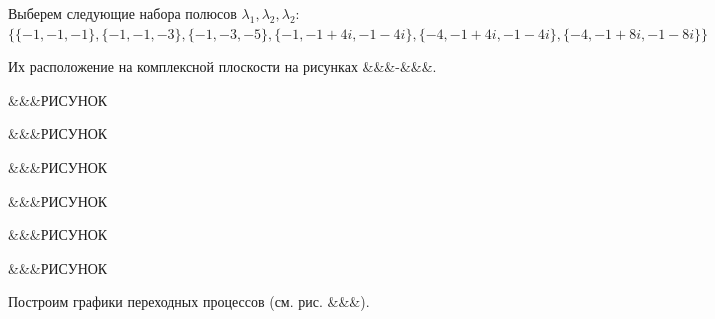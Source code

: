 \vspace{1em}
\begin{par}
\begin{flushleft}
Выберем следующие набора полюсов $\lambda_1 ,\lambda_2 ,\lambda_2$: $\lbrace \lbrace -1,-1,-1\rbrace ,\lbrace -1,-1,-3\rbrace ,\lbrace -1,-3,-5\rbrace ,\lbrace -1,-1+4i,-1-4i\rbrace ,\lbrace -4,-1+4i,-1-4i\rbrace ,\lbrace -4,-1+8i,-1-8i\rbrace \rbrace$
\end{flushleft}
\end{par}

\begin{par}
\begin{flushleft}
Их расположение на комплексной плоскости на рисунках \&\&\&-\&\&\&.
\end{flushleft}
\end{par}

\begin{par}
\begin{flushleft}
\&\&\&РИСУНОК
\end{flushleft}
\end{par}

\begin{par}
\begin{flushleft}
\&\&\&РИСУНОК
\end{flushleft}
\end{par}

\begin{par}
\begin{flushleft}
\&\&\&РИСУНОК
\end{flushleft}
\end{par}

\begin{par}
\begin{flushleft}
\&\&\&РИСУНОК
\end{flushleft}
\end{par}

\begin{par}
\begin{flushleft}
\&\&\&РИСУНОК
\end{flushleft}
\end{par}

\begin{par}
\begin{flushleft}
\&\&\&РИСУНОК
\end{flushleft}
\end{par}

\begin{par}
\begin{flushleft}
Построим графики переходных процессов (см. рис. \&\&\&).
\end{flushleft}
\end{par}

